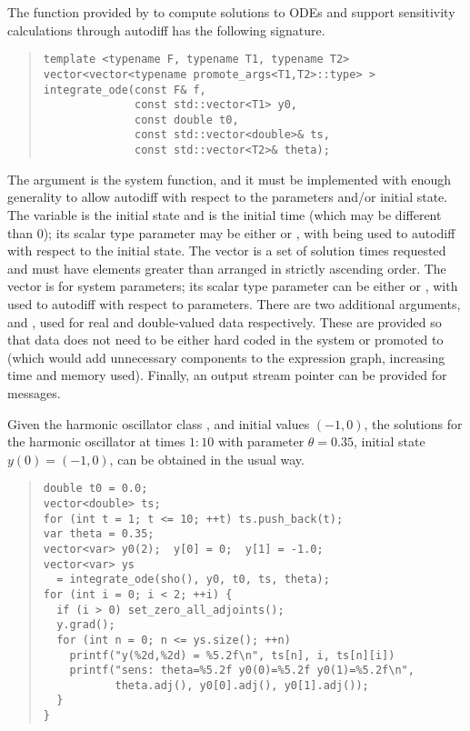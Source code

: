 \documentclass[10pt]{article}
\begin{document}
The function provided by  to compute solutions to
ODEs and support sensitivity calculations through autodiff has the
following signature.
%
\begin{quote}
\begin{Verbatim}
template <typename F, typename T1, typename T2>
vector<vector<typename promote_args<T1,T2>::type> >
integrate_ode(const F& f,
              const std::vector<T1> y0,
              const double t0,
              const std::vector<double>& ts,
              const std::vector<T2>& theta);
\end{Verbatim}
\end{quote}
%
The argument  is the system function, and it must be
implemented with enough generality to allow autodiff with respect to
the parameters and/or initial state.  The variable  is the
initial state and  is the initial time (which may be
different than 0); its scalar type parameter  may be either
 or , with  being used to autodiff
with respect to the initial state.  The vector  is a set of
solution times requested and must have elements greater than 
arranged in strictly ascending order.  The vector  is for
system parameters; its scalar type parameter  can be either
 or , with  used to autodiff with
respect to parameters.  There are two additional arguments, 
and , used for real and double-valued data respectively.
These are provided so that data does not need to be either hard coded
in the system or promoted to  (which would add unnecessary
components to the expression graph, increasing time and memory used).
Finally, an output stream pointer can be provided for messages.

Given the harmonic oscillator class , and initial values
$(-1,0)$, the solutions for the harmonic oscillator at times $1{:}10$
with parameter $\theta = 0.35$, initial state $y(0) = (-1,0)$, can be
obtained in the usual way.
%
\begin{quote}
\begin{Verbatim}
double t0 = 0.0;   
vector<double> ts;  
for (int t = 1; t <= 10; ++t) ts.push_back(t);
var theta = 0.35;
vector<var> y0(2);  y[0] = 0;  y[1] = -1.0;
vector<var> ys 
  = integrate_ode(sho(), y0, t0, ts, theta);
for (int i = 0; i < 2; ++i) {
  if (i > 0) set_zero_all_adjoints();
  y.grad();
  for (int n = 0; n <= ys.size(); ++n) 
    printf("y(%2d,%2d) = %5.2f\n", ts[n], i, ts[n][i])
    printf("sens: theta=%5.2f y0(0)=%5.2f y0(1)=%5.2f\n",
           theta.adj(), y0[0].adj(), y0[1].adj());
  }
}
\end{Verbatim}
\end{quote}
\end{document}
